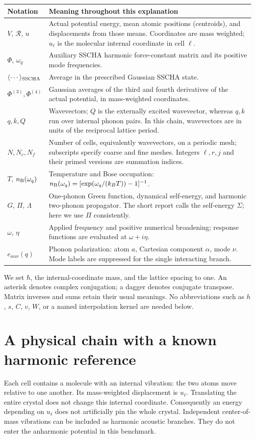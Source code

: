 \documentclass[11pt,a4paper]{article}
\newcommand{\pageheading}[1]{\clearpage\section{#1}}
\begin{document}
\begin{tabular}{@{}p{.22\linewidth}p{.74\linewidth}@{}}
\toprule
Notation & Meaning throughout this explanation \\
\midrule
$V$, $\mathcal R$, $u$ & Actual potential energy, mean atomic positions (centroids), and displacements from those means. Coordinates are mass weighted; $u_\ell$ is the molecular internal coordinate in cell $\ell$.\\
$\Phi$, $\omega_q$ & Auxiliary SSCHA harmonic force-constant matrix and its positive mode frequencies.\\
$\langle\cdots\rangle_{\rm SSCHA}$ & Average in the prescribed Gaussian SSCHA state.\\
$\Phi^{(3)},\Phi^{(4)}$ & Gaussian averages of the third and fourth derivatives of the actual potential, in mass-weighted coordinates.\\
$q,k,Q$ & Wavevectors; $Q$ is the externally excited wavevector, whereas $q,k$ run over internal phonon pairs. In this chain, wavevectors are in units of the reciprocal lattice period.\\
$N,N_c,N_f$ & Number of cells, equivalently wavevectors, on a periodic mesh; subscripts specify coarse and fine meshes. Integers $\ell,r,j$ and their primed versions are summation indices.\\
$T$, $n_{\rm B}(\omega_q)$ & Temperature and Bose occupation: $n_{\rm B}(\omega_q)=[\exp(\omega_q/(k_BT))-1]^{-1}$.\\
$G$, $\Pi$, $\Lambda$ & One-phonon Green function, dynamical self-energy, and harmonic two-phonon propagator. The short report calls the self-energy $\Sigma$; here we use $\Pi$ consistently.\\
$\omega$, $\eta$ & Applied frequency and positive numerical broadening; response functions are evaluated at $\omega+i\eta$.\\
$e_{a\alpha\nu}(q)$ & Phonon polarization: atom $a$, Cartesian component $\alpha$, mode $\nu$. Mode labels are suppressed for the single interacting branch.\\
\bottomrule
\end{tabular}

We set $\hbar$, the internal-coordinate mass, and the lattice spacing to one.
An asterisk denotes complex conjugation; a dagger denotes conjugate transpose.
Matrix inverses and sums retain their usual meanings. No abbreviations such as
$h$, $s$, $C$, $v$, $W$, or a named interpolation kernel are needed below.

\pageheading{A physical chain with a known harmonic reference}
Each cell contains a molecule with an internal vibration: the two atoms move
relative to one another. Its mass-weighted displacement is $u_\ell$. Translating
the entire crystal does not change this internal coordinate. Consequently an
energy depending on $u_\ell$ does not artificially pin the whole crystal.
Independent center-of-mass vibrations can be included as harmonic acoustic
branches. They do not enter the anharmonic potential in this benchmark.
\end{document}
